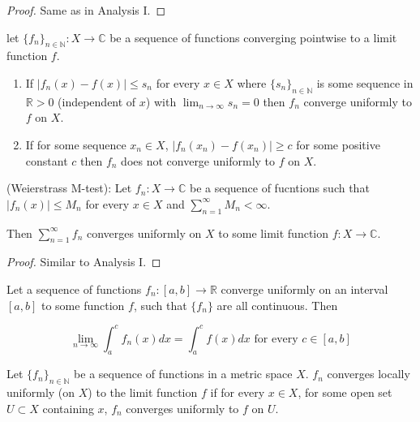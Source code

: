 \begin{proof}
	Same as in Analysis I.
\end{proof}

\begin{lemma}
	let ${\{f_n\}}_{n \in \mathbb{N}}: X \rightarrow \mathbb{C}$ be a sequence of functions converging pointwise to a limit function $f$.

	\begin{enumerate}
		\item If $|f_n(x) - f(x)| \le s_n$ for every $x \in X$ where ${\{s_n\}}_{n \in \mathbb{N}}$ is some sequence in $\mathbb{R} > 0$ (independent of $x$) with $\lim_{n \rightarrow \infty} s_n = 0$ then $f_n$ converge uniformly to $f$ on $X$.
		\item If for some sequence $x_n \in X$, $|f_n(x_n) - f(x_n)| \ge c$ for some positive constant $c$ then $f_n$ does not converge uniformly to $f$ on $X$.
	\end{enumerate}
\end{lemma}

\begin{theorem}
	(Weierstrass M-test): Let $f_n: X \rightarrow \mathbb{C}$ be a sequence of fucntions such that $|f_n(x)| \le M_n$ for every $x \in X$ and $\sum_{n = 1}^{\infty} M_n < \infty$.

	Then $\sum_{n = 1}^{\infty} f_n$ converges uniformly on $X$ to some limit function $f: X \rightarrow \mathbb{C}$.
\end{theorem}

\begin{proof}
	Similar to Analysis I.
\end{proof}

\begin{theorem}
	Let a sequence of functions $f_n: [a, b] \rightarrow \mathbb{R}$ converge uniformly on an interval $[a, b]$ to some function $f$, such that $\{f_n\}$ are all continuous. Then

	\[\lim_{n \rightarrow \infty} \int_a^c f_n(x) dx = \int_a^c f(x) dx \text{ for every } c \in [a, b]\]
\end{theorem}

\begin{definition}
	Let ${\{f_n\}}_{n \in \mathbb{N}}$ be a sequence of functions in a metric space $X$. $f_n$ converges locally uniformly (on $X$) to the limit function $f$ if for every $x \in X$, for some open set $U \subset X$ containing $x$, $f_n$ converges uniformly to $f$ on $U$.
\end{definition}

